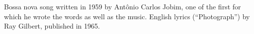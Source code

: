\begin{notes}[History]
Bossa nova song written in 1959 by Antônio Carlos Jobim, one of the first for which he
wrote the words as well as the music. English lyrics (``Photograph'') by Ray Gilbert,
published in 1965.
\end{notes}
